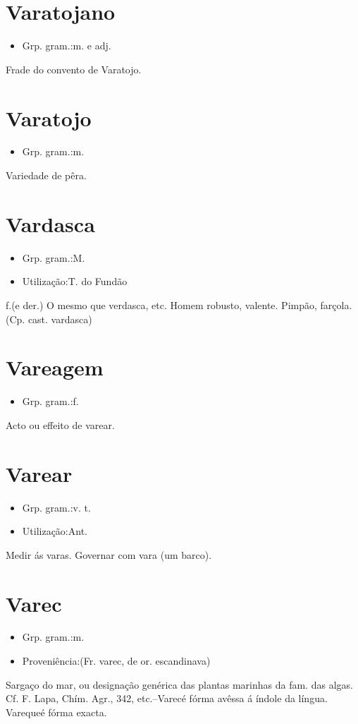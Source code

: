 \documentclass{article}
\begin{document}
\section{Varatojano}
\begin{itemize}
\item {Grp. gram.:m.  e  adj.}
\end{itemize}
Frade do convento de Varatojo.
\section{Varatojo}
\begin{itemize}
\item {Grp. gram.:m.}
\end{itemize}
Variedade de pêra.
\section{Vardasca}
\begin{itemize}
\item {Grp. gram.:M.}
\end{itemize}
\begin{itemize}
\item {Utilização:T. do Fundão}
\end{itemize}
\textunderscore f.\textunderscore  (e der.)
O mesmo que \textunderscore verdasca\textunderscore , etc.
Homem robusto, valente.
Pimpão, farçola.
(Cp. cast. \textunderscore vardasca\textunderscore )
\section{Vareagem}
\begin{itemize}
\item {Grp. gram.:f.}
\end{itemize}
Acto ou effeito de \textunderscore varear\textunderscore .
\section{Varear}
\begin{itemize}
\item {Grp. gram.:v. t.}
\end{itemize}
\begin{itemize}
\item {Utilização:Ant.}
\end{itemize}
Medir ás varas.
Governar com vara (um barco).
\section{Varec}
\begin{itemize}
\item {Grp. gram.:m.}
\end{itemize}
\begin{itemize}
\item {Proveniência:(Fr. \textunderscore varec\textunderscore , de or. escandinava)}
\end{itemize}
Sargaço do mar, ou designação genérica das plantas marinhas da fam. das algas. Cf. F. Lapa, \textunderscore Chím. Agr.\textunderscore , 342, etc.--\textunderscore Varec\textunderscore  é fórma avêssa á índole da língua. \textunderscore Vareque\textunderscore  é fórma exacta.
\end{document}
